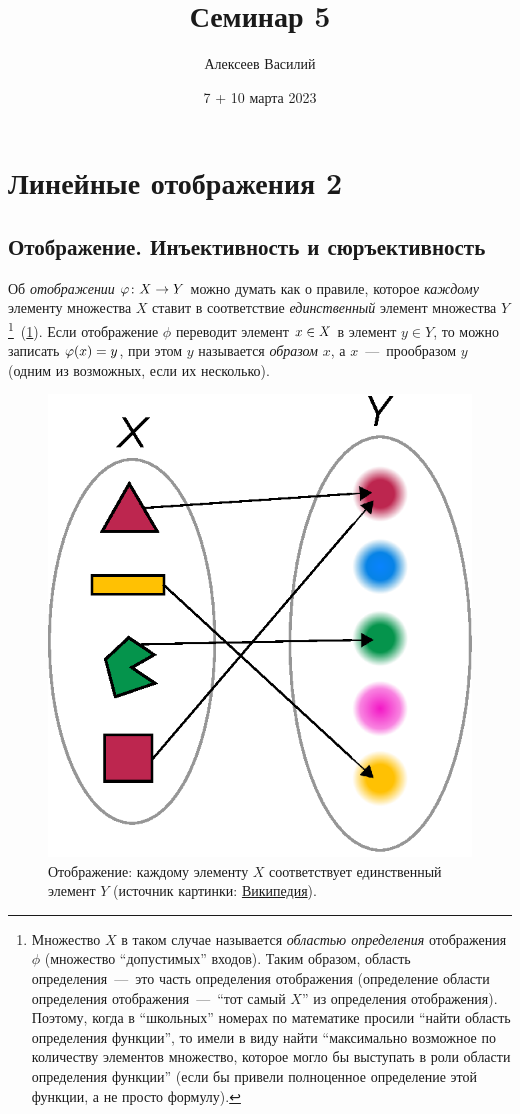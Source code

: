 \documentclass[a4paper,12pt]{article}
\author{Алексеев Василий}
\title{Семинар 5}
\date{7 + 10 марта 2023}
\begin{document}
  \maketitle
  
  \tableofcontents

  \thispagestyle{empty}
  
  \newpage
  


  \section{Линейные отображения 2}
  
  \subsection{Отображение. Инъективность и сюръективность}
  
  Об \emph{отображении} $\phi\colon X \hm\to Y$ можно думать как о правиле, которое \emph{каждому} элементу множества $X$ ставит в соответствие \emph{единственный} элемент множества $Y$\footnote{Множество $X$ в таком случае называется \emph{областью определения} отображения $\phi$ (множество ``допустимых'' входов). Таким образом, область определения~---~это часть определения отображения (определение области определения отображения~---~``тот самый $X$'' из определения отображения). Поэтому, когда в ``школьных'' номерах по математике просили ``найти область определения функции'', то имели в виду найти ``максимально возможное по количеству элементов множество, которое могло бы выступать в роли области определения функции'' (если бы привели полноценное определение этой функции, а не просто формулу).}~(\ref{fig:function}).
  Если отображение $\phi$ переводит элемент $x \hm\in X$ в элемент $y \in Y$, то можно записать $\phi(x) \hm= y$, при этом $y$ называется \emph{образом} $x$, а $x$~---~прообразом $y$ (одним из возможных, если их несколько).
  
  \begin{figure}[h]
    \centering
  
    \includegraphics[width=0.3\columnwidth]{function}
  
    \caption{Отображение: каждому элементу $X$ соответствует единственный элемент $Y$ (источник картинки: \href{https://en.wikipedia.org/wiki/Function\_(mathematics)\#/media/File:Function_color_example_3.svg}{Википедия}).}
    \label{fig:function}
  \end{figure}
  
\end{document}
